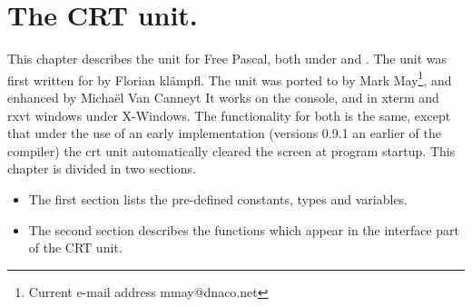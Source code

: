 %
%
%
%
%
\chapter{The CRT unit.}
\label{ch:crtunit}
This chapter describes the  unit for Free Pascal, both under \dos
and \linux. The unit was first written for \dos by Florian kl\"ampfl. 
The unit was ported to \linux by Mark May\footnote{Current
e-mail address \textsf{mmay@dnaco.net}}, and enhanced by Micha\"el Van Canneyt
It works on the \linux console, and in xterm and rxvt windows under
X-Windows. The functionality for both is the same, except that under \linux
the use of an early implementation (versions 0.9.1 an earlier of the
compiler) the crt unit automatically cleared the screen at program startup.
This chapter is divided in two sections. 
\begin{itemize}
\item The first section lists the pre-defined constants, types and variables. 
\item The second section describes the functions which appear in the
interface part of the CRT unit.
\end{itemize}

